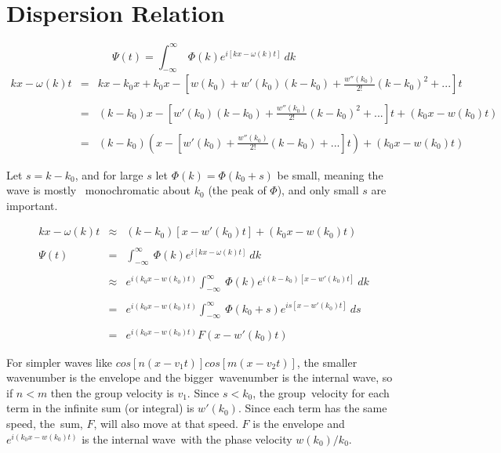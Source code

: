 \documentclass[12pt]{article}
\begin{document}
	\section*{Dispersion Relation}
	\bigskip\bigskip
	\boldmath $$\Psi(t) = \int_{-\infty}^{\infty} \ \Phi(k) e^{i[kx-\omega(k) t]} \ dk$$ \unboldmath
    \begin{eqnarray*}
        kx-\omega(k) t &=& kx - k_0x + k_0x - \left[ w(k_0) + w'(k_0)(k-k_0) + \frac{w''(k_0)}{2!}(k-k_0)^2 + ... \right]t \\ \\
        &=& (k-k_0)x - \left[ w'(k_0)(k-k_0) + \frac{w''(k_0)}{2!}(k-k_0)^2 + ... \right]t + (k_0x - w(k_0)t) \\ \\
        &=& (k-k_0) \left(x - \left[ w'(k_0) + \frac{w''(k_0)}{2!}(k-k_0) + ... \right]t\right) + (k_0x - w(k_0)t)
    \end{eqnarray*}

    Let $s = k-k_0$, and for large $s$ let $\Phi(k)=\Phi(k_0+s)$ be small, meaning the wave is mostly \
    monochromatic about $k_0$ (the peak of $\Phi$), and only small $s$ are important.
    
    \begin{eqnarray*}
        kx-\omega(k) t &\approx& (k-k_0) \left[x - w'(k_0)t \right] + (k_0x - w(k_0)t) \\ \\
        \Psi(t) &=& \int_{-\infty}^{\infty} \ \Phi(k) e^{i[kx-\omega(k)t]} \ dk \\ \\
        &\approx& e^{i(k_0x - w(k_0)t)}\int_{-\infty}^{\infty} \ \Phi(k) e^{i(k-k_0)[x- w'(k_0)t]} \ dk \\ \\
        &=& e^{i(k_0x - w(k_0)t)}\int_{-\infty}^{\infty} \ \Phi(k_0 + s) e^{is[x- w'(k_0)t]} \ ds \\ \\
        &=& e^{i(k_0x - w(k_0)t)} F(x- w'(k_0)t)
    \end{eqnarray*}
    
    For simpler waves like $cos[n(x-v_1t)]cos[m(x-v_2t)]$, the smaller wavenumber is the envelope and the bigger\
    wavenumber is the internal wave, so if $n < m$ then the group velocity is $v_1$. Since $s < k_0$, the group\ 
    velocity for each term in the infinite sum (or integral) is $w'(k_0)$. Since each term has the same speed, the\
    sum, $F$, will also move at that speed. $F$ is the envelope and $e^{i(k_0x - w(k_0)t)}$ is the internal wave\ 
    with the phase velocity $w(k_0)/k_0$.
\end{document}
